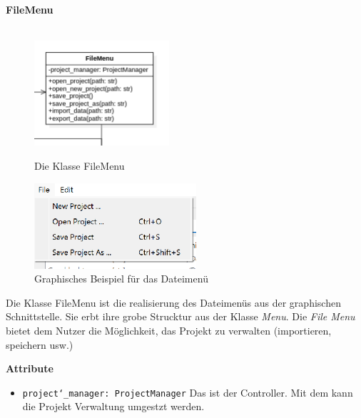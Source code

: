 \documentclass{article}
\begin{document}
\newpage
\textbf{\large{FileMenu}}\\\\
\begin{figure}[H]%
    \centering
    \begin{minipage}[b]{0.4\textwidth}
        \includegraphics[width=5cm]{entwurf/Entwurf_dokument/img/Alissa/FileMenu.png}
        \caption{Die Klasse FileMenu}
    \end{minipage}
    \hfill
    \begin{minipage}[b]{0.4\textwidth}
        \includegraphics[width=6cm]{entwurf/Entwurf_dokument/img/Alissa/EditMenuGUI.png} %
    \caption{Graphisches Beispiel für das Dateimenü}
    \end{minipage}
\end{figure}
Die Klasse FileMenu ist die realisierung des Dateimenüs aus der graphischen Schnittstelle. Sie erbt ihre grobe Strucktur aus der Klasse \textit{Menu}. Die \textit{File Menu} bietet dem Nutzer die Möglichkeit, das Projekt zu verwalten (importieren, speichern usw.)
\newline \newline

\textbf{{Attribute}}
\begin{itemize}
\item \texttt{project\char`_manager: ProjectManager} \newline Das ist der Controller. Mit dem kann die Projekt Verwaltung umgestzt werden.
\end{itemize}
\end{document}
